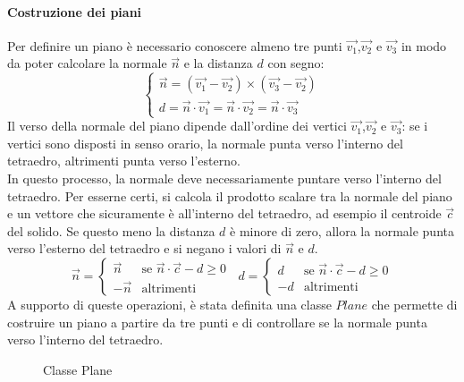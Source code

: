 \paragraph{Costruzione dei piani}
Per definire un piano è necessario conoscere almeno tre punti $\vec{v_1}$,$\vec{v_2}$ e $\vec{v_3}$ in modo da poter calcolare la normale $\vec{n}$ e la distanza $d$ con segno:
\begin{equation}
	\begin{cases}
		\vec{n} = (\vec{v_1} - \vec{v_2}) \times (\vec{v_3} - \vec{v_2}) \\
		d = \vec{n} \cdot \vec{v_1} = \vec{n} \cdot \vec{v_2} = \vec{n} \cdot \vec{v_3}
	\end{cases}
\end{equation}
Il verso della normale del piano dipende dall'ordine dei vertici $\vec{v_1}$,$\vec{v_2}$ e $\vec{v_3}$: se i vertici sono disposti in senso orario, la normale punta verso l'interno del tetraedro, altrimenti punta verso l'esterno.\\
In questo processo, la normale deve necessariamente puntare verso l'interno del tetraedro.
Per esserne certi, si calcola il prodotto scalare tra la normale del piano e un vettore che sicuramente è all'interno del tetraedro, ad esempio il centroide $\vec{c}$ del solido. Se questo meno la distanza $d$ è minore di zero, allora la normale punta verso l'esterno del tetraedro e si negano i valori di $\vec{n}$ e $d$.
\begin{equation}
	\vec{n}  =
	\begin{cases}
		\vec{n}  & \text{se } \vec{n} \cdot \vec{c} - d \geq 0 \\
		-\vec{n} & \text{altrimenti}
	\end{cases} \;\;
	d        =
	\begin{cases}
		d  & \text{se } \vec{n} \cdot \vec{c} - d \geq 0 \\
		-d & \text{altrimenti}
	\end{cases}
\end{equation}
A supporto di queste operazioni, è stata definita una classe $Plane$ che permette di costruire un piano a partire da tre punti e di controllare se la normale punta verso l'interno del tetraedro.
\begin{figure}[H]
	\centering
	\caption{Classe Plane}
\end{figure}
